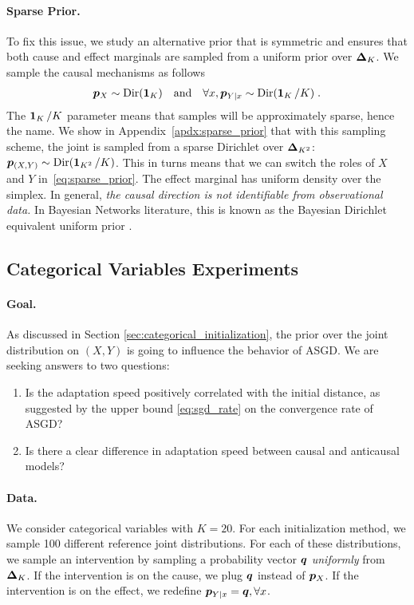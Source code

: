 \paragraph{Sparse Prior.}
To fix this issue, we study an alternative prior that is symmetric and ensures that both cause and effect marginals are sampled from a uniform prior over $\bm{\Delta}_K$. We sample the causal mechanisms as follows
\begin{align}
    \label{eq:sparse_prior}
    {\bm{p}}_X \sim \mathrm{Dir}(\operatorname{\mathbf{1}}_K) 
    \quad \text{and} \quad
    \forall x, {\bm{p}}_{Y|x} \sim \mathrm{Dir}(\operatorname{\mathbf{1}}_K /K) \; .
\end{align}
The $\operatorname{\mathbf{1}}_K /K$ parameter means that samples will be approximately sparse, hence the name.
We show in Appendix~\ref{apdx:sparse_prior} that with this sampling scheme, the joint is sampled from a sparse Dirichlet over $\bm{\Delta}_{K^2}$: ${\bm{p}}_{(X, Y)} \sim \mathrm{Dir}(\operatorname{\mathbf{1}}_{K^2} /K)$. 
This in turns means that we can switch the roles of $X$ and $Y$ in~\eqref{eq:sparse_prior}.
The effect marginal has uniform density over the simplex.
In general, \textit{the causal direction is not identifiable from observational data.}
In Bayesian Networks literature, this is known as the Bayesian Dirichlet equivalent uniform prior \citep{heckerman1995learning}.


\subsection{Categorical Variables Experiments}
\label{ssec:categorical_experiments}

\paragraph{Goal.}
As discussed in Section \ref{sec:categorical_initialization}, the prior over the joint distribution on $(X, Y)$ is going to influence the behavior of ASGD. 
We are seeking answers to two questions:
\begin{enumerate}
    \item Is the adaptation speed positively correlated with the initial distance, as suggested by the upper bound \eqref{eq:sgd_rate} on the convergence rate of ASGD?
    \item Is there a clear difference in adaptation speed between causal and anticausal models?
\end{enumerate}

\paragraph{Data.}
We consider categorical variables with $K =20$.
For each initialization method, we sample 100 different reference joint distributions. For each of these distributions, we sample an intervention by sampling a probability vector ${\bm{q}}$ \textit{uniformly} from $\bm{\Delta}_K$.
If the intervention is on the cause, we plug ${\bm{q}}$ instead of ${\bm{p}}_X$. 
If the intervention is on the effect, we redefine ${\bm{p}}_{Y|x} = {\bm{q}}, \forall x$.


